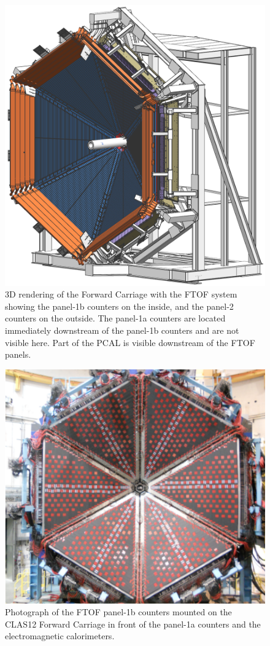 \documentclass[final,3p,twocolumn]{elsarticle}
\begin{document}
\begin{figure}[t!]
\includegraphics[width=0.95\columnwidth]{fwd_carriage-1.png}
\caption{3D rendering of the Forward Carriage with the FTOF system showing the panel-1b counters on the
inside, and the panel-2 counters on the outside. The panel-1a counters are located immediately downstream of the
panel-1b counters and are not visible here. Part of the PCAL is visible downstream of the FTOF panels.}
\label{ftof-model}
\end{figure}
\begin{figure} [htp!]
\includegraphics[width=1.0\columnwidth]{FTOF-1b.png}
\caption{Photograph of the FTOF panel-1b counters mounted on the CLAS12 Forward Carriage in front of the
  panel-1a counters and the electromagnetic calorimeters.} 
\label{ftof-1b}
\end{figure}
\end{document}

